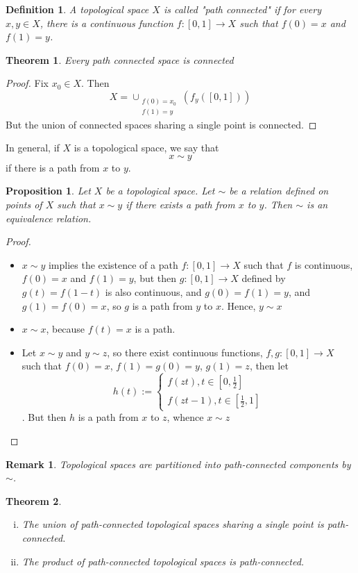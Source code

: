 \documentclass{article}
\newtheorem{theorem}{Theorem}
\newtheorem{remark}{Remark}
\newtheorem{proposition}{Proposition}
\newtheorem{definition}{Definition}
\begin{document}
\begin{definition}
	A topological space $X$ is called "path connected" if for every $x,y\in X$, there is a continuous function $f:[0,1]\to X$ such that $f(0)=x$ and $f(1)=y$.
\end{definition}
\begin{theorem}
	Every path connected space is connected
\end{theorem}
\begin{proof}
	Fix $x_0\in X$.  Then $$X=\cup_{\substack{f(0)=x_0\\f(1)=y	}}(f_y([0,1]))$$  But the union of connected spaces sharing a single point is connected.
\end{proof}
In general, if $X$ is a topological space, we say that $$x\sim y$$ if there is a path from $x$ to $y$.
\begin{proposition}
	Let $X$ be a topological space.  Let $\sim$ be a relation defined on points of $X$ such that $x\sim y$ if there exists a path from $x$ to $y$.  Then $\sim$ is an equivalence relation.
\end{proposition}
\begin{proof}
	\begin{itemize}
		\item $x\sim y$ implies the existence of a path $f: [0,1]\rightarrow X$ such that $f$ is continuous, $f(0)=x$ and $f(1)=y$, but then $g: [0,1]\rightarrow X$ defined by $g(t) = f(1-t)$ is also continuous, and $g(0)=f(1)=y$, and $g(1)=f(0)=x$, so $g$ is a path from $y$ to $x$.  Hence, $y\sim x$
		\item $x\sim x$, because $f(t) = x$ is a path.
		\item Let $x\sim y$ and $y\sim z$, so there exist continuous functions, $f,g: [0,1]\rightarrow X$ such that $f(0)=x$, $f(1)=g(0)=y$, $g(1)=z$, then let $$h(t) := \begin{cases}
		f(zt), t\in[0,\frac{1}{2}]\\
		f(zt-1), t\in[\frac{1}{2},1]
		\end{cases}$$.	But then $h$ is a path from $x$ to $z$, whence $x\sim z$\end{itemize}
\end{proof}
\begin{remark}
	Topological spaces are partitioned into path-connected components by $\sim$.
\end{remark}
\begin{theorem}
	\begin{enumerate}[i.]
		\item The union of path-connected topological spaces sharing a single point is path-connected.
		\item The product of path-connected topological spaces is path-connected.
		\end{enumerate}
\end{theorem}
\end{document}
